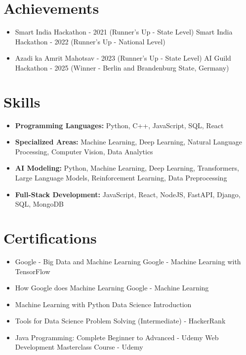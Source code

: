 \documentclass[a4paper,10pt]{article}
\begin{document}
\section*{Achievements}
\begin{itemize}
\item Smart India Hackathon - 2021 (Runner's Up - State Level) \hfill Smart India Hackathon - 2022 (Runner's Up - National Level)
\item Azadi ka Amrit Mahotsav - 2023 (Runner's Up - State Level) \hfill AI Guild Hackathon - 2025 (Winner - Berlin and Brandenburg State, Germany)
\end{itemize}

\section*{Skills}
\begin{itemize}
  \item \textbf{Programming Languages:} Python, C++, JavaScript, SQL, React
  \item \textbf{Specialized Areas:} Machine Learning, Deep Learning, Natural Language Processing, Computer Vision, Data Analytics
  \item \textbf{AI Modeling:} Python, Machine Learning, Deep Learning, Transformers, Large Language Models, Reinforcement Learning, Data Preprocessing
  \item \textbf{Full-Stack Development:} JavaScript, React, NodeJS, FastAPI, Django, SQL, MongoDB
\end{itemize}

\section*{Certifications}
\begin{itemize}
\item Google - Big Data and Machine Learning \hfill Google - Machine Learning with TensorFlow
\item How Google does Machine Learning \hfill Google - Machine Learning
\item Machine Learning with Python \hfill Data Science Introduction
\item Tools for Data Science \hfill Problem Solving (Intermediate) - HackerRank
\item Java Programming: Complete Beginner to Advanced - Udemy \hfill Web Development Masterclass Course - Udemy
\end{itemize}
\end{document}
